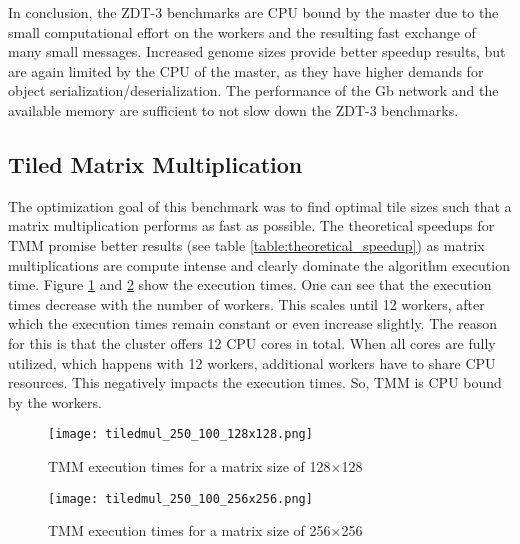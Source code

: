 In conclusion, the ZDT-3 benchmarks are CPU bound by the master due to the small computational effort on the workers and the resulting fast exchange of many small messages. Increased genome sizes provide better speedup results, but are again limited by the CPU of the master, as they have higher demands for object serialization/deserialization. The performance of the \unit[1]{Gb} network and the available memory are sufficient to not slow down the ZDT-3 benchmarks.

\subsection{Tiled Matrix Multiplication}
The optimization goal of this benchmark was to find optimal tile sizes such that a matrix multiplication performs as fast as possible. The theoretical speedups for TMM promise better results (see table \ref{table:theoretical_speedup}) as matrix multiplications are compute intense and clearly dominate the algorithm execution time. Figure \ref{fig:tiledmul_250_100_128x128} and \ref{fig:tiledmul_250_100_256x256} show the execution times. One can see that the execution times decrease with the number of workers. This scales until 12 workers, after which the execution times remain constant or even increase slightly. The reason for this is that the cluster offers 12 CPU cores in total. When all cores are fully utilized, which happens with 12 workers, additional workers have to share CPU resources. This negatively impacts the execution times. So, TMM is CPU bound by the workers.

\begin{figure}
  \centering
  \texttt{[image: tiledmul\_250\_100\_128x128.png]}
  \caption[TMM execution times for a matrix size of 128$\times$128]{TMM execution times for a matrix size of 128$\times$128}
  \label{fig:tiledmul_250_100_128x128}
\end{figure}
\begin{figure}
  \centering
  \texttt{[image: tiledmul\_250\_100\_256x256.png]}
  \caption[TMM execution times for a matrix size of 256$\times$256]{TMM execution times for a matrix size of 256$\times$256}
  \label{fig:tiledmul_250_100_256x256}
\end{figure}


